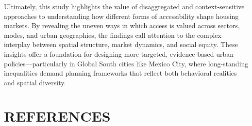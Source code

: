 \documentclass[
  12pt,
]{report}
\begin{document}
Ultimately, this study highlights the value of disaggregated and
context-sensitive approaches to understanding how different forms of
accessibility shape housing markets. By revealing the uneven ways in
which access is valued across sectors, modes, and urban geographies, the
findings call attention to the complex interplay between spatial
structure, market dynamics, and social equity. These insights offer a
foundation for designing more targeted, evidence-based urban
policies---particularly in Global South cities like Mexico City, where
long-standing inequalities demand planning frameworks that reflect both
behavioral realities and spatial diversity.

\newpage

\chapter{REFERENCES}\label{references}
\end{document}
